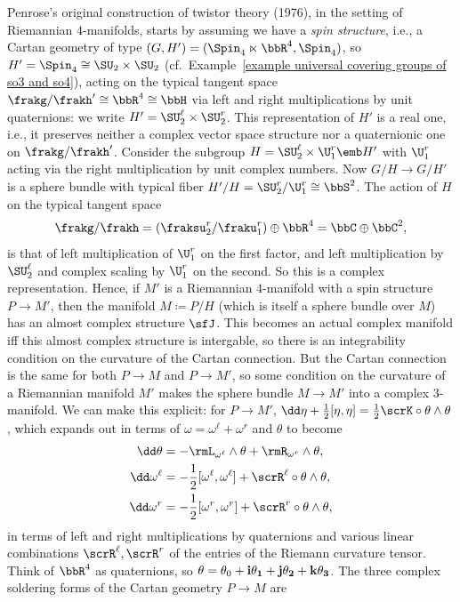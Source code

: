 \begin{example}
    Penrose's original construction of twistor theory (1976), in the setting of Riemannian $4$-manifolds, starts by assuming we have a \emph{spin structure}, i.e., a Cartan geometry of type $(G,H')=(\Spin_4\ltimes\bbR^4,\Spin_4)$, so $H'=\Spin_4\cong \SU_2\times\SU_2$ (cf.\ Example~\ref{example universal covering groups of so3 and so4}), acting on the typical tangent space $\frakg\slash\frakh'\cong\bbR^4\cong \bbH$ via left and right multiplications by unit quaternions: we write $H'=\SU_2^\ell\times\SU_2^r$. This representation of $H'$ is a real one, i.e., it preserves neither a complex vector space structure nor a quaternionic one on $\frakg\slash\frakh'$. Consider the subgroup $H=\SU_2^\ell\times\U_1^r\emb H'$ with $\U_1^r$ acting via the right multiplication by unit complex numbers. Now $G\slash H\to G\slash H'$ is a sphere bundle with typical fiber $H'\slash H=\SU_2^r\slash \U_1^r\cong\bbS^2$. The action of $H$ on the typical tangent space 
    \[\frakg\slash\frakh=(\fraksu_2^r\slash\fraku_1^r)\oplus\bbR^4=\bbC\oplus\bbC^2,\]
    is that of left multiplication of $\U_1^r$ on the first factor, and left multiplication by $\SU_2^\ell$ and complex scaling by $\U_1^r$ on the second. So this is a complex representation. Hence, if $M'$ is a Riemannian $4$-manifold with a spin structure $P\to M'$, then the manifold $M\coloneqq P\slash H$ (which is itself a sphere bundle over $M$) has an almost complex structure $\sfJ$. This becomes an actual complex manifold iff this almost complex structure is intergable, so there is an integrability condition on the curvature of the Cartan connection. But the Cartan connection is the same for both $P\to M$ and $P\to M'$, so some condition on the curvature of a Riemannian manifold $M'$ makes the sphere bundle $M\to M'$ into a complex $3$-manifold. We can make this explicit: for $P\to M'$,
    $\dd\eta+\frac{1}{2}[\eta,\eta]=\frac12\scrK\circ\theta\wedge\theta$,
    which  expands out in terms of $\omega=\omega^\ell+\omega^r$ and $\theta$ to become 
    \begin{align}
        \dd\theta&=-\rmL_{\omega^\ell}\wedge\theta + \rmR_{\omega^r}\wedge\theta,\\
        \dd\omega^\ell & =-\frac12[\omega^\ell,\omega^\ell]+\scrR^\ell\circ\theta\wedge\theta,\\
        \dd\omega^r &= -\frac12[\omega^r,\omega^r]+\scrR^r\circ\theta\wedge\theta,
    \end{align}
    in terms of left and right multiplications by quaternions and various linear combinations $\scrR^\ell,\scrR^r$ of the entries of the Riemann curvature tensor. Think of $\bbR^4$ as quaternions, so $\theta=\theta_0+\bf{i} \theta_1+\bf{j}\theta_2+\bf{k}\theta_3$. The three complex soldering forms of the Cartan geometry $P\to M$ are 

\end{example}
